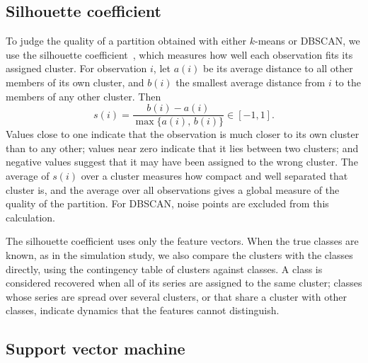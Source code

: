 \subsection{Silhouette coefficient}\label{Subsec:Silhouette}

To judge the quality of a partition obtained with either $k$-means or DBSCAN, we use the silhouette coefficient~\cite{Rousseeuw1987}, which measures how well each observation fits its assigned cluster. For observation $i$, let $a(i)$ be its average distance to all other members of its own cluster, and $b(i)$ the smallest average distance from $i$ to the members of any other cluster. Then
\begin{equation}
	s(i)=\frac{b(i)-a(i)}{\max\{a(i),\,b(i)\}}\in[-1,1].
	\label{eq:Silhouette}
\end{equation}
Values close to one indicate that the observation is much closer to its own cluster than to any other; values near zero indicate that it lies between two clusters; and negative values suggest that it may have been assigned to the wrong cluster. The average of $s(i)$ over a cluster measures how compact and well separated that cluster is, and the average over all observations gives a global measure of the quality of the partition. For DBSCAN, noise points are excluded from this calculation.

The silhouette coefficient uses only the feature vectors. When the true classes are known, as in the simulation study, we also compare the clusters with the classes directly, using the contingency table of clusters against classes. A class is considered recovered when all of its series are assigned to the same cluster; classes whose series are spread over several clusters, or that share a cluster with other classes, indicate dynamics that the features cannot distinguish.

\subsection{Support vector machine}\label{Subsec:SVM}

